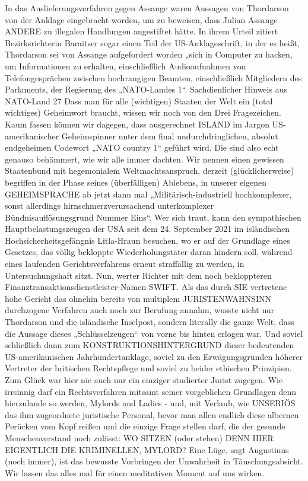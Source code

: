 \begin{multicols}{2}
In das Auslieferungsverfahren gegen Assange waren
Aussagen von Thordarson von der Anklage eingebracht
worden, um zu beweisen, dass Julian Assange ANDERE zu illegalen Handlungen angestiftet hätte. In ihrem
Urteil zitiert Bezirksrichterin Baraitser sogar einen Teil
der US-Anklageschrift, in der es heißt, Thordarson sei
von Assange aufgefordert worden „sich in Computer
zu hacken, um Informationen zu erhalten, einschließlich Audioaufnahmen von Telefongesprächen zwischen
hochrangigen Beamten, einschließlich Mitgliedern des
Parlaments, der Regierung des „NATO-Landes 1“.
Sachdienlicher Hinweis aus NATO-Land 27
Dass man für alle (wichtigen) Staaten der Welt ein (total wichtiges) Geheimwort braucht, wissen wir noch von
den Drei Fragezeichen. Kaum fassen können wir dagegen,
dass ausgerechnet ISLAND im Jargon US-amerikanischer
Geheimspinner unter dem final undurchdringlichen, absolut endgeheimen Codewort „NATO country 1“ geführt
wird. Die sind also echt genauso behämmert, wie wir alle
immer dachten.
Wir nennen einen gewissen Staatenbund mit hegemonialem Weltmachtsanspruch, derzeit (glücklicherweise)
begriffen in der Phase seines (überfälligen) Ablebens, in
unserer eigenen GEHEIMSPRACHE ab jetzt dann mal
„Militärisch-industriell hochkomplexer, sonst allerdings
hirnschmerzverursachend unterkomplexer Bündnisauflösungsgrund Nummer Eins“.
Wer sich traut, kann den sympathischen Hauptbelastungszeugen der USA seit dem 24. September 2021 im
isländischen Hochsicherheitsgefängnis Litla-Hraun besuchen, wo er auf der Grundlage eines Gesetzes, das
völlig bekloppte Wiederholungstäter daran hindern soll,
während eines laufenden Gerichtsverfahrens erneut
straffällig zu werden, in Untersuchungshaft sitzt.
Nun, werter Richter mit dem noch bekloppteren Finanztransaktionsdienstleister-Namen SWIFT. Als das durch
SIE vertretene hohe Gericht das ohnehin bereits von
multiplem JURISTENWAHNSINN durchzogene Verfahren auch noch zur Berufung annahm, wusste nicht nur
Thordarson und die isländische Inselpost, sondern literally die ganze Welt, dass die Aussage dieses „Schlüsselzeugen“ von vorne bis hinten erlogen war.
Und soviel schließlich dann zum KONSTRUKTIONSHINTERGRUND dieser bedeutenden US-amerikanischen Jahrhundertanklage, soviel zu den Erwägungsgründen höherer Vertreter der britischen Rechtspflege
und soviel zu beider ethischen Prinzipien.
Zum Glück war hier nie auch nur ein einziger studierter Jurist zugegen. Wie irrsinnig darf ein Rechtsverfahren
mitsamt seiner vorgeblichen Grundlagen denn hierzulande so werden, Mylords and Ladies - und, mit Verlaub,
wie UNSERIÖS das ihm zugeordnete juristische Personal, bevor man allen endlich diese albernen Perücken
vom Kopf reißen und die einzige Frage stellen darf, die
der gesunde Menschenverstand noch zulässt: WO SITZEN (oder stehen) DENN HIER EIGENTLICH DIE KRIMINELLEN, MYLORD?
Eine Lüge, sagt Augustinus (noch immer), ist das bewusste Vorbringen der Unwahrheit in Täuschungsabsicht. Wir lassen das alles mal für einen meditativen Moment auf uns wirken.


\end{multicols}
